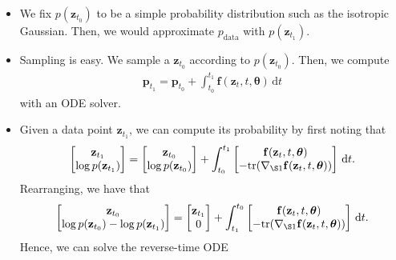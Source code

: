 \documentclass[10pt]{article}
\newcommand{\dee}{\mathrm{d}}
\newcommand{\ve}[1]{\mathbf{#1}}
\newcommand{\mrm}[1]{\mathrm{#1}}
\newcommand{\ves}[1]{\boldsymbol{#1}}
\newcommand{\tr}{\mathrm{tr}}
\begin{document}
\begin{itemize}
  \item We fix $p(\ve{z}_{t_0})$ to be a simple probability distribution such as the isotropic Gaussian. Then, we would approximate $p_{\mrm{data}}$ with $p(\ve{z}_{t_1})$.
  
  \item Sampling is easy. We sample a $\ve{z}_{t_0}$ according to $p(\ve{z}_{t_0})$. Then, we compute
  \begin{align*}
    \ve{p}_{t_1} = \ve{p}_{t_0} + \int_{t_0}^{t_1} \ve{f}(\ve{z}_t, t, \ves{\theta})\, \dee t
  \end{align*}
  with an ODE solver.

  \item Given a data point $\ve{z}_{t_1}$, we can compute its probability by first noting that
  \begin{align*}
    \begin{bmatrix}
      \ve{z}_{t_1} \\
      \log p(\ve{z}_{t_1})
    \end{bmatrix}
    = \begin{bmatrix}
      \ve{z}_{t_0} \\
      \log p(\ve{z}_{t_0})
    \end{bmatrix}
    + \int_{t_0}^{t_1}
    \begin{bmatrix}
      \ve{f}(\ve{z}_t, t, \ves{\theta}) \\
      -\tr(\nabla_{\S1}\ve{f}(\ve{z}_t, t, \ves{\theta}))
    \end{bmatrix}\, \dee t.
  \end{align*}
  Rearranging, we have that
  \begin{align*}
    \begin{bmatrix}
      \ve{z}_{t_0} \\
      \log p(\ve{z}_{t_0}) - \log p(\ve{z}_{t_1})
    \end{bmatrix}
    = \begin{bmatrix}
      \ve{z}_{t_1} \\
      0
    \end{bmatrix}
    + \int_{t_1}^{t_0}
    \begin{bmatrix}
      \ve{f}(\ve{z}_t, t, \ves{\theta}) \\
      -\tr(\nabla_{\S1}\ve{f}(\ve{z}_t, t, \ves{\theta}))
    \end{bmatrix}\, \dee t.
  \end{align*}
  Hence, we can solve the reverse-time ODE
  \begin{align*}

\end{align*}
\end{itemize}
\end{document}
